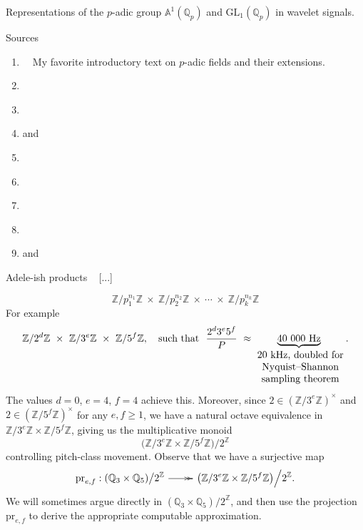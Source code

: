 \documentclass[letterpaper,11pt, reqno]{amsart}
\makeatletter
\newtheorem{monodromy theorem}{Monodromy Theorem}[subsection]
\newtheorem{wild conjecture}[theorem]{Wild Conjecture}
\newtheorem{research objectives}{Research objectives}[subsection]
\newtheorem{research question}[theorem]{Research questions}
\newtheorem{aside question}[theorem]{Aside question}
\newtheorem{audio example}[theorem]{\loudspeaker[3] Example}
\newtheorem{blank remark}[theorem]{}
\newtheorem{terminology and comment}[theorem]{Terminology and comment}
\newtheorem{purity hypothesis}[theorem]{Purity hypothesis}
\newtheorem{corollary of the purity hypothesis}[theorem]{Corollary of the purity hypothesis}
\newcommand{\QQ} {{\mathbb Q}}
\newcommand{\ZZ} {{\mathbb Z}}
\newcommand{\epi}{\!\xymatrix{{}\ar@{->>}[r]&{}}\!}
\numberwithin{equation}{theorem}
\makeatother
\begin{document}
\vskip 1cm

\begin{section}{Representations of the $p$-adic group $\mathbb{A}^{\!1}(\mathbb{Q}_{p})$
and $\text{GL}_{1}(\mathbb{Q}_{p})$
in wavelet signals.}



\begin{subsection}{Sources}
	\begin{enumerate}[{\bf\ \ \ \ \ \ 1.}]
	\item
	\cite[Chp. 4]{Guillot}\ \textemdash\ My favorite introductory text on $p$-adic fields and their extensions.
	\item
	\cite[Chp. XV: {\em J. T. Tate's thesis}, 1950]{CF}
	\item
	\cite[\S VII]{Lang}
	\item
	\cite[\S 1]{GHv1} and \cite{GHv2}
	\item
	\cite{Berkovich}
	\item
	\cite[\S 7.2.3]{Mallat}
	\item
	\cite[\S5.5]{SN}
	\item
	\cite{Vladimirov88}
	\item
	\cite{Kozyrev} and \cite{KozKhre}
	\end{enumerate}
\end{subsection}

\begin{subsection}{Adele-ish products}
\ 
{\color{red} [...]}

	$$
	\ZZ/p^{n_1}_{1}\ZZ
	\ \times\ 
	\ZZ/p^{n_2}_{2}\ZZ
	\ \times\ 
	\cdots
	\ \times\ 
	\ZZ/p^{n_{k}}_{k}\ZZ
	$$
For example
	$$
	\ZZ/2^{d}\ZZ
	\ \times\ 
	\ZZ/3^{e}\ZZ
	\ \times\ 
	\ZZ/5^{f}\ZZ,
	\ \ \ \text{such that}\ \ \frac{2^{d}3^{e}5^{f}}{P}
	\ \approx\!
	\underset{
	{\smaller\smaller\smaller\smaller
	\begin{array}{c}
	\text{20\ kHz, doubled for}
	\\
	\text{Nyquist–Shannon}
	\\
	\text{sampling theorem}
	\end{array}
	}\!\!
	}{\underbrace{40\ 000\ \text{Hz}}}.
	$$
The values $d=0$, $e=4$, $f=4$ achieve this. Moreover, since $2\in(\ZZ/3^{e}\ZZ)^{\times}$ and $2\in(\ZZ/5^{f}\ZZ)^{\times}$ for any $e,f\ge 1$, we have a natural octave equivalence in $\ZZ/3^e\ZZ\times\ZZ/5^f\ZZ$, giving us the multiplicative monoid
	$$
	\big(\ZZ/3^e\ZZ\times\ZZ/5^f\ZZ\big)\Big/2^{\ZZ}
	$$
controlling pitch-class movement. Observe that we have a surjective map
	$$
	\text{pr}_{e,f}:(\QQ_{3}\times\QQ_5)\big/2^{\ZZ}
	\epi
	\big(\ZZ/3^e\ZZ\times\ZZ/5^f\ZZ\big)\Big/2^{\ZZ}.
	$$
We will sometimes argue directly in $(\QQ_{3}\times\QQ_5)\big/2^{\ZZ}$, and then use the projection $\text{pr}_{e,f}$ to derive the appropriate computable approximation.


\end{subsection}
\end{section}
\end{document}
